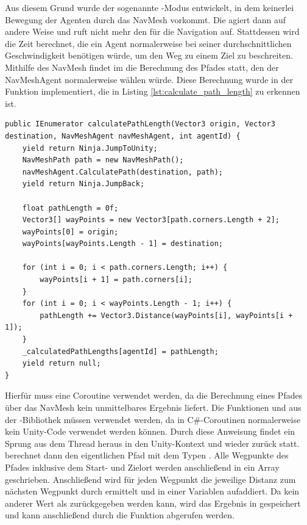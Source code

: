 Aus diesem Grund wurde der sogenannte -Modus entwickelt, in dem keinerlei Bewegung der Agenten durch das NavMesh vorkommt. Die  agiert dann auf andere Weise und ruft nicht mehr den  für die Navigation auf. Stattdessen wird die Zeit berechnet, die ein Agent normalerweise bei seiner durchschnittlichen Geschwindigkeit benötigen würde, um den Weg zu einem Ziel zu beschreiten. Mithilfe des NavMesh findet im  die Berechnung des Pfades statt, den der NavMeshAgent normalerweise wählen würde. Diese Berechnung wurde in der Funktion  implementiert, die in Listing \ref{lst:calculate_path_length} zu erkennen ist.


\begin{minipage}{\linewidth}
\begin{lstlisting}[linewidth=16.4cm, label=lst:calculate_path_length, caption=Berechnung der Pfadlänge durch \inlinecode{calculatePathLength}, xleftmargin=1cm]
public IEnumerator calculatePathLength(Vector3 origin, Vector3 destination, NavMeshAgent navMeshAgent, int agentId) {
    yield return Ninja.JumpToUnity;
    NavMeshPath path = new NavMeshPath();
    navMeshAgent.CalculatePath(destination, path);
    yield return Ninja.JumpBack;

    float pathLength = 0f;
    Vector3[] wayPoints = new Vector3[path.corners.Length + 2];
    wayPoints[0] = origin;
    wayPoints[wayPoints.Length - 1] = destination;

    for (int i = 0; i < path.corners.Length; i++) {
        wayPoints[i + 1] = path.corners[i];
    }
    for (int i = 0; i < wayPoints.Length - 1; i++) {
        pathLength += Vector3.Distance(wayPoints[i], wayPoints[i + 1]);
    }
    _calculatedPathLengths[agentId] = pathLength;
    yield return null;
}
\end{lstlisting}
\end{minipage}

Hierfür muss eine Coroutine verwendet werden, da die Berechnung eines Pfades über das NavMesh kein unmittelbares Ergebnis liefert. Die Funktionen  und  aus der -Bibliothek \cite{ninja} müssen verwendet werden, da in C\#-Coroutinen normalerweise kein Unity-Code verwendet werden können. Durch diese Anweisung findet ein Sprung aus dem Thread heraus in den Unity-Kontext und wieder zurück statt.
 berechnet dann den eigentlichen Pfad mit dem Typen . Alle Wegpunkte des Pfades inklusive dem Start- und Zielort werden anschließend in ein Array geschrieben. Anschließend wird für jeden Wegpunkt die jeweilige Distanz zum nächsten Wegpunkt durch  ermittelt und in einer Variablen aufaddiert. Da kein anderer Wert als  zurückgegeben werden kann, wird das Ergebnis in  gespeichert und kann anschließend durch die Funktion  abgerufen werden.

